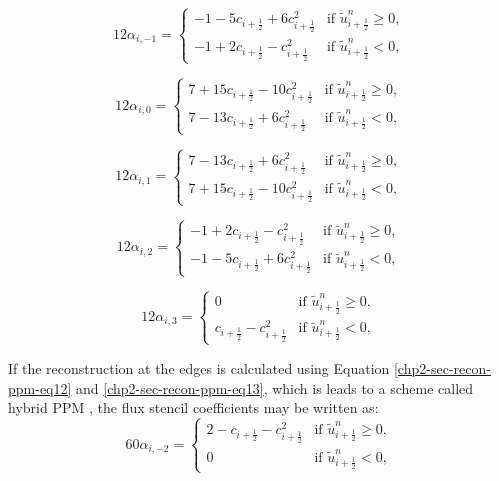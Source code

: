 \begin{equation*}
	12\alpha_{i,-1} =  
    	\begin{cases}
		-1 - 5c_{i+\frac{1}{2}}  + 6c_{i+\frac{1}{2}}^2 
		& \text{if } \tilde{u}_{i+\frac{1}{2}}^n \geq 0,\\
		-1 +  2c_{i+\frac{1}{2}}   -   c_{i+\frac{1}{2}}^2 & \text{if } \tilde{u}_{i+\frac{1}{2}}^n<0,
    	\end{cases}
\end{equation*}

\begin{equation*}
	12\alpha_{i,0} =  
    	\begin{cases}
		7 + 15c_{i+\frac{1}{2}} - 10c_{i+\frac{1}{2}}^2 
		& \text{if } \tilde{u}_{i+\frac{1}{2}}^n \geq 0,\\
		7 - 13c_{i+\frac{1}{2}}  +  6c_{i+\frac{1}{2}}^2 & \text{if } \tilde{u}_{i+\frac{1}{2}}^n<0,
    	\end{cases}
\end{equation*}

\begin{equation*}
	12\alpha_{i,1} =  
    	\begin{cases}
		7 - 13c_{i+\frac{1}{2}} +  6c_{i+\frac{1}{2}}^2 & \text{if } \tilde{u}_{i+\frac{1}{2}}^n \geq 0,\\
		7 + 15c_{i+\frac{1}{2}} - 10c_{i+\frac{1}{2}}^2 & \text{if } \tilde{u}_{i+\frac{1}{2}}^n<0,
    	\end{cases}
\end{equation*}

\begin{equation*}
	12\alpha_{i,2} =  
    	\begin{cases}
		-1 +  2c_{i+\frac{1}{2}} -   c_{i+\frac{1}{2}}^2 
		& \text{if } \tilde{u}_{i+\frac{1}{2}}^n \geq 0,\\
		-1 - 5c_{i+\frac{1}{2}} +  6c_{i+\frac{1}{2}}^2 & \text{if } \tilde{u}_{i+\frac{1}{2}}^n<0,
    	\end{cases}
\end{equation*}

\begin{equation*}
	12\alpha_{i,3} =  
    	\begin{cases}
		0 & \text{if } \tilde{u}_{i+\frac{1}{2}}^n \geq 0,\\
		c_{i+\frac{1}{2}}-   c_{i+\frac{1}{2}}^2 & \text{if } \tilde{u}_{i+\frac{1}{2}}^n<0,
    	\end{cases}
\end{equation*}

If the reconstruction at the edges is calculated using Equation \eqref{chp2-sec-recon-ppm-eq12}
and \eqref{chp2-sec-recon-ppm-eq13}, which is leads to a scheme called hybrid PPM \citep{putman:2007}, 
the flux stencil coefficients may be written as:
\begin{equation*}
	60\alpha_{i,-2} =  
    	\begin{cases}
		2 - c_{i+\frac{1}{2}}-c_{i+\frac{1}{2}}^2 &
		\text{if } \tilde{u}_{i+\frac{1}{2}}^n \geq 0,\\
		0 & \text{if } \tilde{u}_{i+\frac{1}{2}}^n<0,
    	\end{cases}
\end{equation*}

